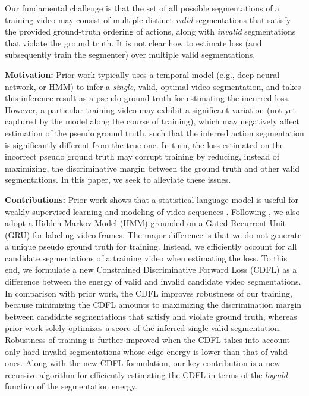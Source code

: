 \documentclass[10pt,twocolumn,letterpaper]{article}
\begin{document}
Our fundamental challenge is that the set of all possible segmentations of a training video may consist of multiple distinct {\em valid} segmentations that satisfy the provided ground-truth ordering of actions, along with {\em invalid} segmentations that violate the ground truth. It is not clear how to estimate loss (and subsequently train the segmenter) over multiple valid segmentations.  



{\bf Motivation:}  Prior work \cite{huang2016connectionist, richard2017weaklysupervised, richard2017weakly, ding2018weakly, richard2018neuralnetwork} typically uses a temporal model (e.g., deep neural network, or HMM) to infer a {\em single}, valid, optimal video segmentation, and takes this inference result as a pseudo ground truth for estimating the incurred loss. However, a particular training video may exhibit a significant variation (not yet captured by the model along the course of training), which may negatively affect estimation of the pseudo ground truth, such that the inferred action segmentation is significantly different from the true one. In turn, the loss estimated on the incorrect pseudo ground truth may corrupt  training by reducing, instead of maximizing, the discriminative margin between the ground truth and other valid segmentations.
In this paper, we seek to alleviate these issues.


{\bf Contributions:} Prior work shows that a statistical language model is useful for weakly supervised learning and modeling of video sequences  \cite{lin2017ctc, koller2017re, richard2016temporal, richard2018neuralnetwork, chang2019d3tw}. Following \cite{richard2018neuralnetwork}, we also adopt a Hidden Markov Model (HMM) grounded on a Gated Recurrent Unit (GRU) \cite{chung2014empirical} for labeling video frames. The major difference is that we do not generate a unique pseudo ground truth for training. Instead, we efficiently account for all candidate segmentations of a training video when estimating the loss. To this end, we formulate a new Constrained Discriminative Forward Loss (CDFL) as a difference between the energy of valid and invalid candidate video segmentations. In comparison with prior work, the CDFL improves robustness of our training, because minimizing the CDFL amounts to maximizing the discrimination margin between candidate segmentations that satisfy and violate ground truth, whereas prior work solely optimizes a score of the inferred single valid segmentation. Robustness of training is further improved when the CDFL takes into account only hard invalid segmentations whose edge energy is lower than that of valid ones.  Along with the new CDFL formulation, our key contribution is a new recursive algorithm for efficiently estimating the CDFL in terms of the {\em logadd} function of the segmentation energy.
\end{document}
